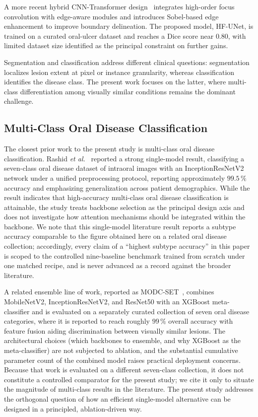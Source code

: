 A more recent hybrid CNN-Transformer design~\cite{ref26} integrates high-order
focus convolution with edge-aware modules and introduces Sobel-based edge
enhancement to improve boundary delineation. The proposed model, HF-UNet, is
trained on a curated oral-ulcer dataset and reaches a Dice score near $0.80$,
with limited dataset size identified as the principal constraint on further
gains.

Segmentation and classification address different clinical questions:
segmentation localizes lesion extent at pixel or instance granularity, whereas
classification identifies the disease class. The present work focuses on the
latter, where multi-class differentiation among visually similar conditions
remains the dominant challenge.

\subsection{Multi-Class Oral Disease Classification}

The closest prior work to the present study is multi-class oral disease
classification. Rashid \emph{et al.}~\cite{ref19} reported a strong single-model
result, classifying a seven-class oral disease dataset of intraoral images with
an InceptionResNetV2 network under a unified preprocessing protocol, reporting
approximately $99.5\,\%$ accuracy and emphasizing generalization across patient
demographics. While the result indicates that high-accuracy multi-class oral
disease classification is attainable, the study treats backbone selection as
the principal design axis and does not investigate how attention mechanisms
should be integrated within the backbone. We note that this single-model
literature result reports a subtype accuracy comparable to the figure obtained
here on a related oral disease collection; accordingly, every claim of a
``highest subtype accuracy'' in this paper is scoped to the controlled
nine-baseline benchmark trained from scratch under one matched recipe, and is
never advanced as a record against the broader literature.

A related ensemble line of work, reported as MODC-SET~\cite{ref22}, combines
MobileNetV2, InceptionResNetV2, and ResNet50 with an XGBoost meta-classifier and
is evaluated on a separately curated collection of seven oral disease
categories, where it is reported to reach roughly $99\,\%$ overall accuracy with
feature fusion aiding discrimination between visually similar lesions. The
architectural choices (which backbones to ensemble, and why XGBoost as the
meta-classifier) are not subjected to ablation, and the substantial
cumulative parameter count of the combined model raises practical deployment
concerns. Because that work is evaluated on a different seven-class collection,
it does not constitute a controlled comparator for the present study; we cite
it only to situate the magnitude of multi-class results in the literature. The
present study addresses the orthogonal question of how an efficient
single-model alternative can be designed in a principled, ablation-driven way.

